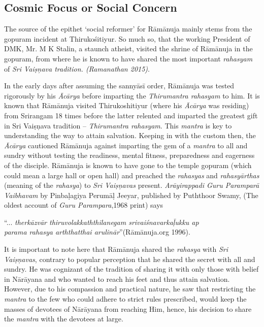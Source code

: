 \newpage


\subsection*{Cosmic Focus or Social Concern}

The source of the epithet ‘social reformer’ for Rāmānuja mainly stems from the gopuram incident at Thirukośitiyur. So much so, that the working President of DMK, Mr. M K Stalin, a staunch atheist, visited the shrine of Rāmānuja in the gopuram, from where he is known to have shared the most important \textit{rahasyam} of \textit{Sri Vaiṣņava tradition. (Ramanathan 2015)}.

In the early days after assuming the sannyāsī order, Rāmānuja was tested rigorously by his \textit{Ācārya} before imparting the \textit{Thirumantra rahasyam} to him. It is known that Rāmānuja visited Thirukoshitiyur (where his \textit{Ācārya} was residing) from Srirangam 18 times before the latter relented and imparted the greatest gift in Sri Vaiṣņava tradition – \textit{Thirumantra rahasyam}. This \textit{mantra} is key to understanding the way to attain salvation. Keeping in with the custom then, the \textit{Ācārya} cautioned Rāmānuja against imparting the gem of a \textit{mantra} to all and sundry without testing the readiness, mental fitness, preparedness and eagerness of the disciple. Rāmānuja is known to have gone to the temple gopuram (which could mean a large hall or open hall) and preached the \textit{rahasyas} and \textit{rahasyārthas} (meaning of the \textit{rahasya}) to \textit{Sri Vaiṣņavas }present. \textit{Arāyirappadi Guru Paramparā Vaibhavam} by Pinbaḷagiya Perumāḷ Jeeyar, published by Puththoor Swamy, (The oldest account of \textit{Guru Parampara},1968 print) says

\begin{myquote}
“... \textit{therkāzvār thiruvolakkaththilanegam srivaiśnavarkaḹukku ap}\\\textit{parama rahasya arththatthai arulinār}”(Rāmānuja.org 1996).
\end{myquote}

It is important to note here that Rāmānuja shared the \textit{rahasya} with \textit{Sri Vaiṣņavas}, contrary to popular perception that he shared the secret with all and sundry. He was cognizant of the tradition of sharing it with only those with belief in Nārāyana and who wanted to reach his feet and thus attain salvation. However, due to his compassion and practical nature, he saw that restricting the \textit{mantra} to the few who could adhere to strict rules prescribed, would keep the masses of devotees of Nārāyana from reaching Him, hence, his decision to share the \textit{mantra }with the devotees at large.

